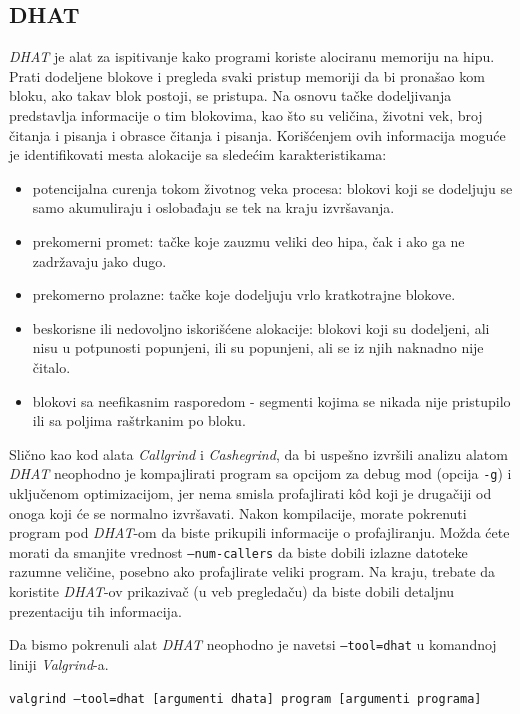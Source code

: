 \documentclass[12pt,oneside]{memoir}
\theoremstyle{plain}
\theoremstyle{definition}
\begin{document}
\subsection{DHAT}
\textit{DHAT} je alat za ispitivanje kako programi koriste alociranu memoriju na hipu. Prati dodeljene blokove i pregleda svaki pristup memoriji da bi pronašao kom bloku, ako takav blok postoji, se pristupa. Na osnovu tačke dodeljivanja predstavlja informacije o tim blokovima, kao što su veličina, životni vek, broj čitanja i pisanja i obrasce čitanja i pisanja. Korišćenjem ovih informacija moguće je identifikovati mesta alokacije sa sledećim karakteristikama:
\begin{itemize}
\item potencijalna curenja tokom životnog veka procesa: blokovi koji se dodeljuju se samo akumuliraju i oslobađaju se tek na kraju izvršavanja.
\item prekomerni promet: tačke koje zauzmu veliki deo hipa, čak i ako ga ne zadržavaju jako dugo.
\item prekomerno prolazne: tačke koje dodeljuju vrlo kratkotrajne blokove.
\item beskorisne ili nedovoljno iskorišćene alokacije: blokovi koji su dodeljeni, ali nisu u potpunosti popunjeni, ili su popunjeni, ali se iz njih naknadno nije čitalo.
\item blokovi sa neefikasnim rasporedom - segmenti kojima se nikada nije pristupilo ili sa poljima raštrkanim po bloku.
\end{itemize}

Slično kao kod alata \textit{Callgrind} i \textit{Cashegrind}, da bi uspešno izvršili analizu alatom \textit{DHAT} neophodno je kompajlirati program sa opcijom za debug mod (opcija \texttt{-g}) i uključenom optimizacijom, jer nema smisla profajlirati k\^od koji je drugačiji od onoga koji će se normalno izvršavati. Nakon kompilacije, morate pokrenuti program pod \textit{DHAT}-om da biste prikupili informacije o profajliranju. Možda ćete morati da smanjite vrednost \texttt{--num-callers} da biste dobili izlazne datoteke razumne veličine, posebno ako profajlirate veliki program. Na kraju, trebate da koristite \textit{ DHAT}-ov prikazivač (u veb pregledaču) da biste dobili detaljnu prezentaciju tih informacija.

Da bismo pokrenuli alat \textit{ DHAT} neophodno je navetsi \texttt{–tool=dhat} u komandnoj liniji \textit{Valgrind}-a.
\begin{center}
\texttt{valgrind --tool=dhat [argumenti dhata] program [argumenti programa]}
\end{center}
\end{document}
